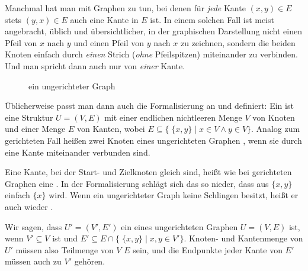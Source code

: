 Manchmal hat man mit Graphen zu tun, bei denen für \emph{jede} Kante
$(x,y)\in E$ stets $(y,x)\in E$ auch eine Kante in $E$ ist.
% 
In einem solchen Fall ist meist angebracht, üblich und
übersichtlicher, in der graphischen Darstellung nicht einen Pfeil von
$x$ nach $y$ und einen Pfeil von $y$ nach $x$ zu zeichnen, sondern die
beiden Knoten einfach durch \emph{einen} Strich (\emph{ohne}
Pfeilspitzen) miteinander zu verbinden.
% 
Und man spricht dann auch nur von \emph{einer} Kante.
% 
\begin{figure}[ht] \centering
  \caption{ein ungerichteter Graph}
  \label{}
\end{figure}
% 
Üblicherweise passt man dann auch die Formalisierung an und definiert:
Ein  ist eine Struktur $U=(V,E)$ mit einer
endlichen nichtleeren Menge $V$ von Knoten und einer Menge $E$ von
Kanten, wobei $E\subseteq \{ \; \{x,y\} \mid x\in V \land y\in V\}$.
% 
Analog zum gerichteten Fall heißen zwei Knoten eines ungerichteten
Graphen , wenn sie durch eine Kante miteinander verbunden sind.


Eine Kante, bei der Start- und Zielknoten gleich sind, heißt wie bei
gerichteten Graphen eine .
% 
In der Formalisierung schlägt sich das so nieder, dass aus $\{x,y\}$
einfach $\{x\}$ wird.
% 
Wenn ein ungerichteter Graph keine Schlingen besitzt, heißt er auch
wieder .

Wir sagen, dass $U'=(V',E')$ ein 
eines ungerichteten Graphen $U=(V,E)$ ist, wenn $V'\subseteq V$ ist
und $E'\subseteq E \cap \{ \; \{x,y\} \mid x,y\in V'\}$.
% 
Knoten- und Kantenmenge von $U'$ müssen also Teilmenge von $V$ \resp
$E$ sein, und die Endpunkte jeder Kante von $E'$ müssen auch zu $V'$
gehören.

